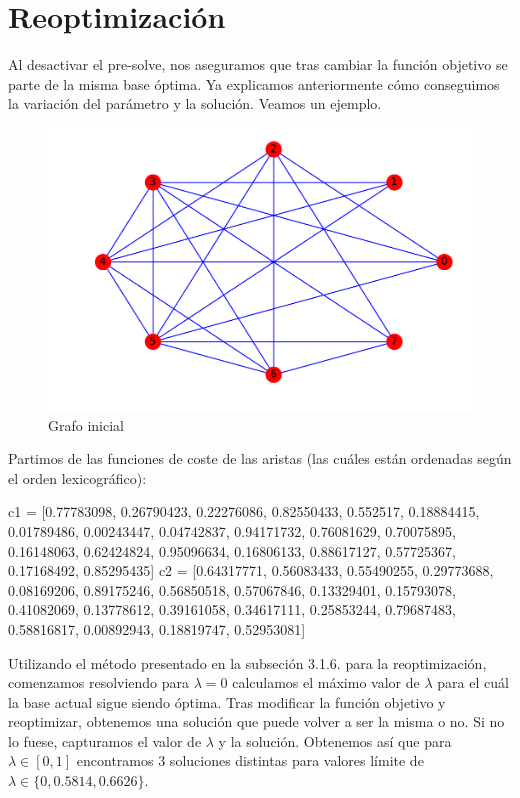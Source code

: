 \documentclass[twoside,a4paper,openright,12pt,tikz]{book}
\begin{document}
\section{Reoptimización}
Al desactivar el pre-solve, nos aseguramos que tras cambiar la función objetivo se parte de la misma base óptima. Ya explicamos anteriormente cómo conseguimos la variación del parámetro y la solución. Veamos un ejemplo.
\begin{figure}[h!]
\centering
\includegraphics[scale=0.5]{opt}
\caption{Grafo inicial}
\end{figure}

Partimos de las funciones de coste de las aristas (las cuáles están ordenadas según el orden lexicográfico):
\begin{pythone}
c1 = [0.77783098, 0.26790423, 0.22276086, 0.82550433, 0.552517, 0.18884415, 0.01789486, 0.00243447, 0.04742837, 0.94171732, 0.76081629, 0.70075895, 0.16148063, 0.62424824, 0.95096634, 0.16806133, 0.88617127, 0.57725367, 0.17168492, 0.85295435]
c2 = [0.64317771, 0.56083433, 0.55490255, 0.29773688, 0.08169206, 0.89175246, 0.56850518, 0.57067846, 0.13329401, 0.15793078, 0.41082069, 0.13778612, 0.39161058, 0.34617111, 0.25853244, 0.79687483, 0.58816817, 0.00892943, 0.18819747, 0.52953081]
\end{pythone}
Utilizando el método presentado en la subseción 3.1.6. para la reoptimización, comenzamos resolviendo para $\lambda=0$ calculamos el máximo valor de $\lambda$ para el cuál la base actual sigue siendo óptima. Tras modificar la función objetivo y reoptimizar, obtenemos una solución que puede volver a ser la misma o no. Si no lo fuese, capturamos el valor de $\lambda$ y la solución. Obtenemos así que para $\lambda\in [0,1]$ encontramos 3 soluciones distintas para valores límite de $\lambda \in \{0,0.5814,0.6626\}$.
\end{document}
